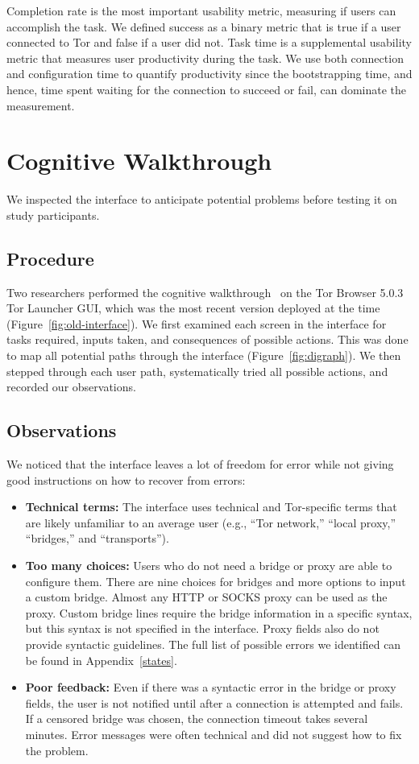 \documentclass[USenglish,oneside,twocolumn]{article}
\begin{document}
Completion rate is the most important usability metric, measuring if users can accomplish the task. We defined success as a binary metric that is true if a user connected to Tor and false if a user did not.
Task time is a supplemental usability metric that measures user productivity during the task. We use both connection and configuration time to quantify productivity since the bootstrapping time, and hence, time spent waiting for the connection to succeed or fail, can dominate the measurement.


\section{Cognitive Walkthrough}
\label{sec:inspection}
We inspected the interface to anticipate potential problems before testing it on study participants.

\subsection{Procedure} 
Two researchers performed the cognitive walkthrough~\cite{cognitive-walkthrough} on the Tor Browser 5.0.3 Tor Launcher GUI, which was the most recent version deployed at the time (Figure~\ref{fig:old-interface}). We first examined each screen in the interface for tasks required, inputs taken, and consequences of possible actions. This was done to map all potential paths through the interface (Figure~\ref{fig:digraph}). We then stepped through each user path, systematically tried all possible actions, and recorded our observations. 

\subsection{Observations}
We noticed that the interface leaves a lot of freedom for error while not giving good instructions on how to recover from errors: \\

\begin{itemize}
\item {\bfseries Technical terms:} The interface uses technical and Tor-specific terms that are likely unfamiliar to an average user (e.g., ``Tor network,'' ``local proxy,'' ``bridges,'' and ``transports''). 
\item {\bfseries Too many choices:}  Users who do not need a bridge or proxy are able to configure them.
There are nine choices for bridges and more options to input a custom bridge.
Almost any HTTP or SOCKS proxy can be used as the proxy.
Custom bridge lines require the bridge information in a specific syntax, but this syntax is not specified in the interface.
Proxy fields also do not provide syntactic guidelines.
The full list of possible errors we identified can be found in Appendix~\ref{states}.
\item {\bfseries Poor feedback:} Even if there was a syntactic error in the bridge or proxy fields, the user is not notified until after a connection is attempted and fails. If a censored bridge was chosen, the connection timeout takes several minutes. Error messages were often technical and did not suggest how to fix the problem.
\end{itemize}
\end{document}
